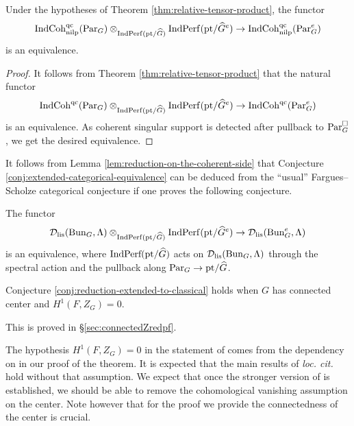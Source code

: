 \begin{lem}\label{lem:reduction-on-the-coherent-side}
    Under the hypotheses of Theorem \ref{thm:relative-tensor-product}, the functor 
    $$\mathrm{IndCoh}_{\textnormal{nilp}}^{\textnormal{qc}}(\mathrm{Par}_G) \otimes_{\mathrm{Ind}\mathrm{Perf}(\mathrm{pt}/\widehat{G})} \mathrm{Ind}\mathrm{Perf}(\mathrm{pt}/\widehat{G}^e) \to \mathrm{IndCoh}_{\mathrm{nilp}}^{\textnormal{qc}}(\mathrm{Par}_G^e)$$
    is an equivalence. 
\end{lem}

\begin{proof}
    It follows from Theorem \ref{thm:relative-tensor-product} that the natural functor 
    $$\mathrm{IndCoh}^{\textnormal{qc}}(\mathrm{Par}_G) \otimes_{\mathrm{Ind}\mathrm{Perf}(\mathrm{pt}/\widehat{G})} \mathrm{Ind}\mathrm{Perf}(\mathrm{pt}/\widehat{G}^e) \to \mathrm{IndCoh}^{\textnormal{qc}}(\mathrm{Par}_G^e)$$
    is an equivalence. As coherent singular support is detected after pullback to $\mathrm{Par}_G^{\square}$, we get the desired equivalence.
\end{proof}

It follows from Lemma \ref{lem:reduction-on-the-coherent-side} that Conjecture \ref{conj:extended-categorical-equivalence} can be deduced from the ``usual'' Fargues--Scholze categorical conjecture if one proves the following conjecture. 

\begin{conj}\label{conj:reduction-extended-to-classical}
    The functor 
    $$\mathcal{D}_{\textnormal{lis}}(\mathrm{Bun}_{G},\Lambda) \otimes_{\mathrm{Ind}\mathrm{Perf}(\mathrm{pt}/\widehat{G})} \mathrm{Ind}\mathrm{Perf}(\mathrm{pt}/\widehat{G}^e) \to\mathcal{D}_{\textnormal{lis}}(\mathrm{Bun}_{G}^e,\Lambda)$$
    is an equivalence, where $\textnormal{IndPerf}(\mathrm{pt}/\widehat{G})$ acts on $\mathcal{D}_{\textnormal{lis}}(\mathrm{Bun}_{G},\Lambda)$ through the spectral action and the pullback along $\mathrm{Par}_G \to \mathrm{pt}/\widehat{G}$.
\end{conj}

\begin{thm}\label{thm:reduction-connected-center-case}
    Conjecture \ref{conj:reduction-extended-to-classical} holds when $G$ has connected center and $H^1(F,Z_G) = 0$.
\end{thm}

This is proved in \S \ref{sec:connectedZredpf}.

\begin{rque}
    The hypothesis $H^1(F,Z_G) = 0$ in the statement of  comes from the dependency on \cite{Zou26} in our proof of the theorem. It is expected that the main results of \emph{loc. cit.} hold without that assumption. We expect that once the stronger version of \cite{Zou26} is established, we should be able to remove the cohomological vanishing assumption on the center. Note however that for the proof we provide the connectedness of the center is crucial. 
\end{rque}

